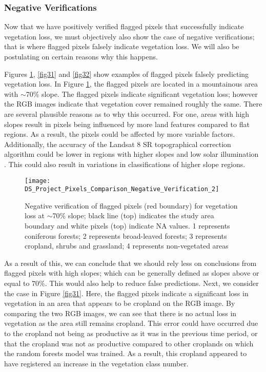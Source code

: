 \subsubsection{Negative Verifications}

\justify
Now that we have positively verified flagged pixels that successfully indicate vegetation loss, we must objectively also show the case of negative verifications; that is where flagged pixels falsely indicate vegetation loss. We will also be postulating on certain reasons why this happens.

\justify
Figures \ref{fig30}, \ref{fig31} and \ref{fig32} show examples of flagged pixels falsely predicting vegetation loss. In Figure \ref{fig30}, the flagged pixels are located in a mountainous area with $\sim$70$\%$ slope. The flagged pixels indicate significant vegetation loss; however the RGB images indicate that vegetation cover remained roughly the same. There are several plausible reasons as to why this occurred. For one, areas with high slopes result in pixels being influenced by more land features compared to flat regions. As a result, the pixels could be affected by more variable factors. Additionally, the accuracy of the Landsat 8 SR topographical correction algorithm could be lower in regions with higher slopes and low solar illumination \citep{landsat2016}. This could also result in variations in classifications of higher slope regions.

\begin{figure}[H]
	\centering
	\texttt{[image: DS\_Project\_Pixels\_Comparison\_Negative\_Verification\_2]}
	\caption[Negative verification of flagged pixels (red boundary) for vegetation loss at $\sim$70$\%$ slope; black line (top) indicates the study area boundary and white pixels (top) indicate NA values]{Negative verification of flagged pixels (red boundary) for vegetation loss at $\sim$70$\%$ slope; black line (top) indicates the study area boundary and white pixels (top) indicate NA values. 1 represents coniferous forests; 2 represents broad-leaved forests; 3 represents cropland, shrubs and grassland; 4 represents non-vegetated areas}
	\label{fig30}
\end{figure}

\justify
As a result of this, we can conclude that we should rely less on conclusions from flagged pixels with high slopes; which can be generally defined as slopes above or equal to $70\%$. This would also help to reduce false predictions. Next, we consider the case in Figure \ref{fig31}. Here, the flagged pixels indicate a significant loss in vegetation in an area that appears to be cropland on the RGB image. By comparing the two RGB images, we can see that there is no actual loss in vegetation as the area still remains cropland. This error could have occurred due to the cropland not being as productive as it was in the previous time period, or that the cropland was not as productive compared to other croplands on which the random forests model was trained. As a result, this cropland appeared to have registered an increase in the vegetation class number. 


